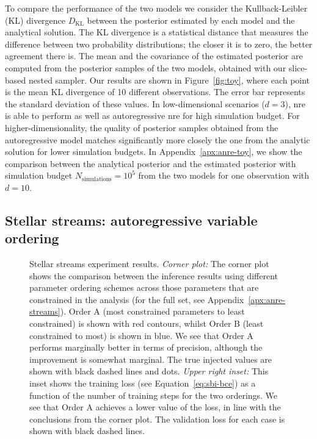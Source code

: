 To compare the performance of the two models we consider the Kullback-Leibler (KL) \cite{Kullback:1951zyt} divergence $D_\mathrm{KL}$ between the posterior estimated by each model and the analytical solution. The KL divergence is a statistical distance that measures the difference between two probability distributions; the closer it is to zero, the better agreement there is. The mean and the covariance of the estimated posterior are computed from the posterior samples of the two models, obtained with our slice-based nested sampler. 
Our results are shown in Figure~\ref{fig:toy}, where each point is the mean KL divergence of 10 different observations. The error bar represents the standard deviation of these values. In low-dimensional scenarios ($d=3$), \gls*{nre} is able to perform as well as autoregressive \gls*{nre} for high simulation budget. For higher-dimensionality, the quality of posterior samples obtained from the autoregressive model matches significantly more closely the one from the analytic solution for lower simulation budgets. In Appendix~\ref{apx:anre-toy}, we show the comparison between the analytical posterior and the estimated posterior with simulation budget $N_\mathrm{simulations} = 10^{5}$ from the two models for one observation with $d=10$.

\subsection{Stellar streams: autoregressive variable ordering} \label{subsec:anre-stream}

\begin{figure}
    \centering
    \caption{Stellar streams experiment results. \emph{Corner plot:} The corner plot shows the comparison between the inference results using different parameter ordering schemes across those parameters that are constrained in the analysis (for the full set, see Appendix~\ref{apx:anre-streams}). Order A (most constrained parameters to least constrained) is shown with red contours, whilst Order B (least constrained to most) is shown in blue. We see that Order A performs marginally better in terms of precision, although the improvement is somewhat marginal. The true injected values are shown with black dashed lines and dots. \emph{Upper right inset:} This inset shows the training loss (see Equation~\eqref{eq:sbi-bce}) as a function of the number of training steps for the two orderings. We see that Order A achieves a lower value of the loss, in line with the conclusions from the corner plot. The validation loss for each case is shown with black dashed lines.}
    \label{fig:streams_loss}
\end{figure}

